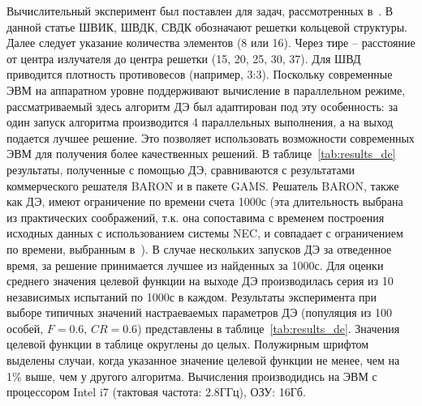 Вычислительный эксперимент был поставлен для задач, рассмотренных в~\cite{tyu:daor,tyunin:oniip}. В данной статье ШВИК, ШВДК, СВДК обозначают решетки кольцевой структуры. Далее следует указание количества элементов (8 или 16). Через тире -- расстояние от центра излучателя до центра решетки (15, 20, 25, 30, 37). Для ШВД приводится плотность противовесов (например, 3:3). Поскольку современные ЭВМ на аппаратном уровне поддерживают вычисление в параллельном режиме, рассматриваемый здесь алгоритм ДЭ был адаптирован под эту особенность: за один запуск алгоритма производится 4 параллельных выполнения, а на выход подается лучшее решение. Это позволяет использовать возможности современных ЭВМ для получения более качественных решений. В таблице~\ref{tab:results_de} результаты, полученные с помощью ДЭ, сравниваются с результатами коммерческого решателя BARON и в пакете GAMS.
Решатель BARON, также как ДЭ, имеют ограничение по времени счета 1000с (эта длительность выбрана из практических соображений, т.к. она сопоставима с временем построения исходных данных с использованием системы NEC, и совпадает с ограничением по времени, выбранным в~\cite{tyu:daor}).
В случае нескольких запусков ДЭ за отведенное время, за решение принимается лучшее из найденных за 1000с. Для оценки среднего значения целевой функции на выходе ДЭ производилась серия из 10 независимых испытаний по 1000с в каждом. Результаты эксперимента при выборе типичных значений настраеваемых параметров ДЭ (популяция из 100 особей, $F=0.6$, $CR=0.6$) представлены в  таблице~\ref{tab:results_de}. Значения целевой функции в таблице округлены до целых. Полужирным шрифтом выделены случаи, когда указанное значение целевой функции не менее, чем на 1\% выше, чем у другого алгоритма. Вычисления производидись на ЭВМ с процессором Intel i7 (тактовая частота:
2.8ГГц), ОЗУ: 16Гб.

